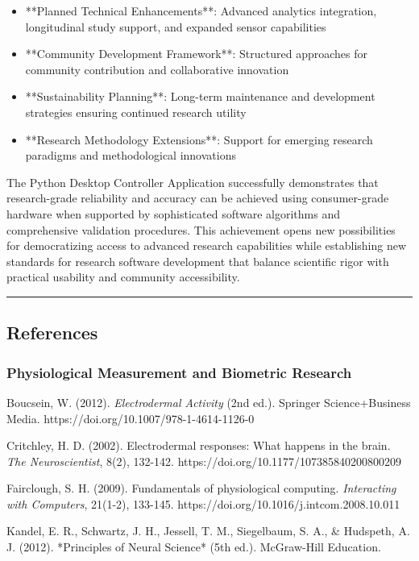 \documentclass[11pt,a4paper]{article}
\begin{document}
\begin{itemize}
\item **Planned Technical Enhancements**: Advanced analytics integration, longitudinal study support, and expanded sensor
  capabilities
\item **Community Development Framework**: Structured approaches for community contribution and collaborative innovation
\item **Sustainability Planning**: Long-term maintenance and development strategies ensuring continued research utility
\item **Research Methodology Extensions**: Support for emerging research paradigms and methodological innovations

\end{itemize}
The Python Desktop Controller Application successfully demonstrates that research-grade reliability and accuracy can be
achieved using consumer-grade hardware when supported by sophisticated software algorithms and comprehensive validation
procedures. This achievement opens new possibilities for democratizing access to advanced research capabilities while
establishing new standards for research software development that balance scientific rigor with practical usability and
community accessibility.

\hrule

\subsection{References}

\subsubsection{Physiological Measurement and Biometric Research}

Boucsein, W. (2012). \textit{Electrodermal Activity} (2nd ed.). Springer Science+Business
Media. https://doi.org/10.1007/978-1-4614-1126-0

Critchley, H. D. (2002). Electrodermal responses: What happens in the brain. \textit{The Neuroscientist}, 8(2),
132-142. https://doi.org/10.1177/107385840200800209

Fairclough, S. H. (2009). Fundamentals of physiological computing. \textit{Interacting with Computers}, 21(1-2),
133-145. https://doi.org/10.1016/j.intcom.2008.10.011

Kandel, E. R., Schwartz, J. H., Jessell, T. M., Siegelbaum, S. A., \& Hudspeth, A. J. (2012). *Principles of Neural
Science* (5th ed.). McGraw-Hill Education.
\end{document}
